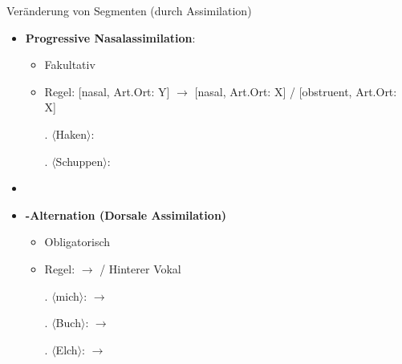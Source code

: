 
\begin{frame}
{Veränderung von Segmenten (durch Assimilation)}

\begin{itemize}
	\item \textbf{Progressive Nasalassimilation}:

	\begin{itemize}
		\item Fakultativ
		\item Regel: [nasal, Art.Ort: Y] $\rightarrow$ [nasal, Art.Ort: X] /  [obstruent, Art.Ort: X] \underline{\quad} 

		\ex. $\langle$Haken$\rangle$:  \ras 
		\textipa{[ha:k\textsyllabic{n}]} \ras \textipa{[ha:k\textsyllabic{N}]}
		
		\ex. $\langle$Schuppen$\rangle$:  \ras 
		\textipa{[SU\.p\textsyllabic{n}]} \ras \textipa{[SU\.p\textsyllabic{m}]}

	\end{itemize}

	\item[]
	\item \textbf{\textipa{[\c{c}]/[x]}-Alternation (Dorsale Assimilation)}

	\begin{itemize}
		\item Obligatorisch
		\item Regel:  $\rightarrow$ \textipa{[x]} / Hinterer Vokal \underline{\quad}

		\ex. $\langle$mich$\rangle$:  $\rightarrow$ \textipa{[mI\c{c}]}
		
		\ex. $\langle$Buch$\rangle$:  $\rightarrow$ \textipa{[bUx]}
		
		\ex. $\langle$Elch$\rangle$:  $\rightarrow$ \textipa{[PEl\c{c}]}

	\end{itemize}		

\end{itemize}

\end{frame}




